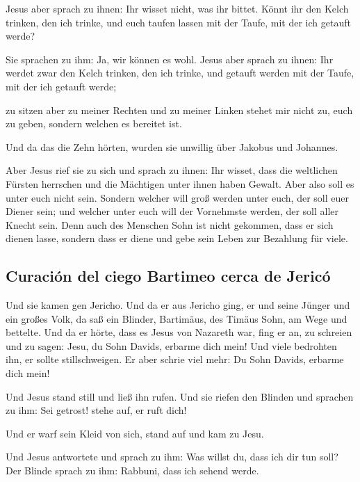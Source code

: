  Jesus aber sprach zu ihnen: Ihr wisset nicht, was ihr
bittet. Könnt ihr den Kelch trinken, den ich trinke, und euch taufen
lassen mit der Taufe, mit der ich getauft werde?

 Sie sprachen zu ihm: Ja, wir können es wohl. Jesus aber
sprach zu ihnen: Ihr werdet zwar den Kelch trinken, den ich trinke, und
getauft werden mit der Taufe, mit der ich getauft werde;

 zu sitzen aber zu meiner Rechten und zu meiner Linken
stehet mir nicht zu, euch zu geben, sondern welchen es bereitet ist.

 Und da das die Zehn hörten, wurden sie unwillig über
Jakobus und Johannes.

 Aber Jesus rief sie zu sich und sprach zu ihnen: Ihr
wisset, dass die weltlichen Fürsten herrschen und die Mächtigen unter
ihnen haben Gewalt.  Aber also soll es unter euch nicht
sein. Sondern welcher will groß werden unter euch, der soll euer Diener
sein;  und welcher unter euch will der Vornehmste werden,
der soll aller Knecht sein.  Denn auch des Menschen Sohn
ist nicht gekommen, dass er sich dienen lasse, sondern dass er diene und
gebe sein Leben zur Bezahlung für viele.

\hypertarget{curaciuxf3n-del-ciego-bartimeo-cerca-de-jericuxf3}{%
\subsection{Curación del ciego Bartimeo cerca de
Jericó}\label{curaciuxf3n-del-ciego-bartimeo-cerca-de-jericuxf3}}

 Und sie kamen gen Jericho. Und da er aus Jericho ging,
er und seine Jünger und ein großes Volk, da saß ein Blinder, Bartimäus,
des Timäus Sohn, am Wege und bettelte.  Und da er hörte,
dass es Jesus von Nazareth war, fing er an, zu schreien und zu sagen:
Jesu, du Sohn Davids, erbarme dich mein!  Und viele
bedrohten ihn, er sollte stillschweigen. Er aber schrie viel mehr: Du
Sohn Davids, erbarme dich mein!

 Und Jesus stand still und ließ ihn rufen. Und sie riefen
den Blinden und sprachen zu ihm: Sei getrost! stehe auf, er ruft dich!

 Und er warf sein Kleid von sich, stand auf und kam zu
Jesu.

 Und Jesus antwortete und sprach zu ihm: Was willst du,
dass ich dir tun soll? Der Blinde sprach zu ihm: Rabbuni, dass ich
sehend werde.

